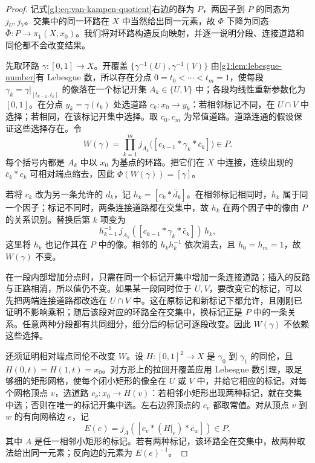 \begin{proof}
	记式\eqref{g1:eq:van-kampen-quotient}右边的群为 \(P\)，两因子到 \(P\) 的同态为 \(j_U,j_V\)。交集中的同一环路在 \(X\) 中当然给出同一元素，故 \(\Phi\) 下降为同态 \(\bar\Phi:P\to\pi_1(X,x_0)\)。我们将对环路构造反向映射，并逐一说明分段、连接道路和同伦都不会改变结果。

	先取环路 \(\gamma:[0,1]\to X\)。开覆盖 \(\{\gamma^{-1}(U),\gamma^{-1}(V)\}\) 由\cref{g1:lem:lebesgue-number}有 Lebesgue 数，所以存在分点 \(0=t_0<\cdots<t_m=1\)，使每段 \(\gamma_k=\gamma|_{[t_{k-1},t_k]}\) 的像落在一个标记开集 \(A_k\in\{U,V\}\) 中；各段均线性重新参数化为 \([0,1]\)。在分点 \(y_k=\gamma(t_k)\) 处选道路 \(c_k:x_0\to y_k\)：若相邻标记不同，在 \(U\cap V\) 中选择；若相同，在该标记开集中选择。取 \(c_0,c_m\) 为常值道路。道路连通的假设保证这些选择存在。令
	\[
		W(\gamma)=\prod_{k=1}^{m}j_{A_k}\bigl([c_{k-1}*\gamma_k*\bar c_k]\bigr)\in P.
	\]
	每个括号内都是 \(A_k\) 中以 \(x_0\) 为基点的环路。把它们在 \(X\) 中连接，连续出现的 \(\bar c_k*c_k\) 可相对端点缩去，因此 \(\bar\Phi(W(\gamma))=[\gamma]\)。

	若将 \(c_k\) 改为另一条允许的 \(d_k\)，记 \(h_k=[c_k*\bar d_k]\)。在相邻标记相同时，\(h_k\) 属于同一个因子；标记不同时，两条连接道路都在交集中，故 \(h_k\) 在两个因子中的像由 \(P\) 的关系识别。替换后第 \(k\) 项变为
	\[
		h_{k-1}^{-1}\,j_{A_k}([c_{k-1}*\gamma_k*\bar c_k])\,h_k,
	\]
	这里将 \(h_k\) 也记作其在 \(P\) 中的像。相邻的 \(h_kh_k^{-1}\) 依次消去，且 \(h_0=h_m=1\)，故 \(W(\gamma)\) 不变。

	在一段内部增加分点时，只需在同一个标记开集中增加一条连接道路；插入的反路与正路相消，所以值仍不变。如果某一段同时位于 \(U,V\)，要改变它的标记，可以先把两端连接道路都改选在 \(U\cap V\) 中。这在原标记和新标记下都允许，且刚刚已证明不影响乘积；随后该段对应的环路全在交集中，换标记正是 \(P\) 中的一条关系。任意两种分段都有共同细分，细分后的标记可逐段改变。因此 \(W(\gamma)\) 不依赖这些选择。

	还须证明相对端点同伦不改变 \(W\)。设 \(H:[0,1]^2\to X\) 是 \(\gamma_0\) 到 \(\gamma_1\) 的同伦，且 \(H(0,t)=H(1,t)=x_0\)。对方形上的拉回开覆盖应用 Lebesgue 数引理，取足够细的矩形网格，使每个闭小矩形的像全在 \(U\) 或 \(V\) 中，并给它相应的标记。对每个网格顶点 \(v\)，选道路 \(c_v:x_0\to H(v)\)：若相邻小矩形出现两种标记，就在交集中选；否则在唯一的标记开集中选。左右边界顶点的 \(c_v\) 都取常值。对从顶点 \(v\) 到 \(w\) 的有向网格边 \(e\)，记
	\[
		E(e)=j_A([c_v*(H|_e)*\bar c_w])\in P,
	\]
	其中 \(A\) 是任一相邻小矩形的标记。若有两种标记，该环路全在交集中，故两种取法给出同一元素；反向边的元素为 \(E(e)^{-1}\)。


\end{proof}
